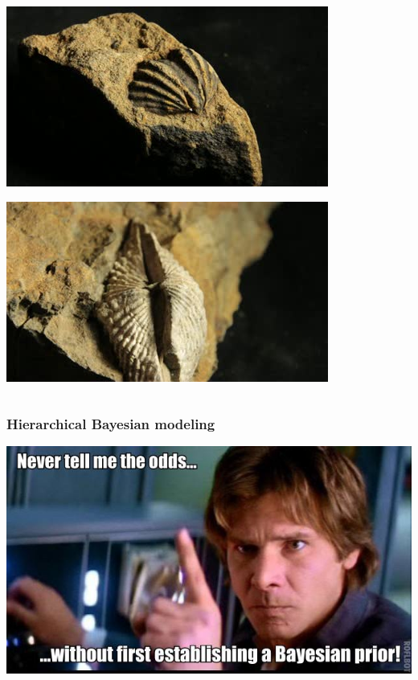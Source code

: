 \documentclass{beamer}
\begin{document}
\begin{frame}
\begin{columns}
\begin{column}{0.5\textwidth}
\begin{center}
        \vspace{0.63cm}

        \includegraphics[height = 0.25\textheight, keepaspectratio = true]{figure/stock-brac2}
        
        \includegraphics[height = 0.25\textheight, keepaspectratio = true]{figure/stock-brac3}
        
        \tiny{}
      \end{center}
    \end{column}
  \end{columns}
\end{frame}

\begin{frame}
  \frametitle{Hierarchical Bayesian modeling}

  \includegraphics[width = \textwidth,height = 0.8\textheight,keepaspectratio = true]{figure/han_bayes}

  \tiny{}
\end{frame}
\end{document}
